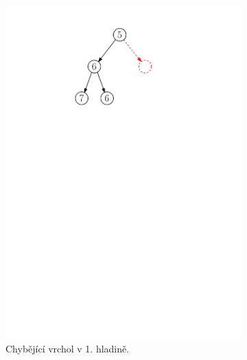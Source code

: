 \begin{figure}[h]
\begin{subfigure}{5cm}
        \includegraphics[scale=.4]{01-grafalgo/images/ch01_nekor_halda_1}
        \caption{Chybějící vrchol v 1. hladině.}
        \label{subfig:nekorektni_halda_1}
    \end{subfigure}
    \quad
    \begin{subfigure}{5cm}
        \centering

\end{subfigure}
\end{figure}
